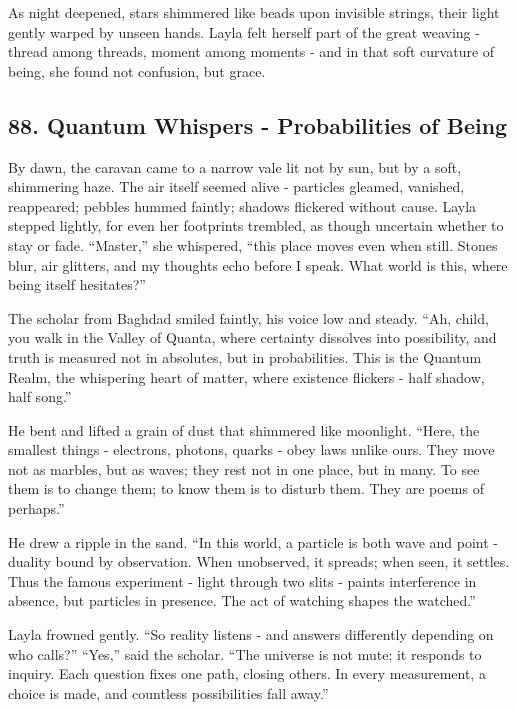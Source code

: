 \documentclass[
  letterpaper,
  DIV=11,
  numbers=noendperiod]{scrreprt}
\begin{document}
As night deepened, stars shimmered like beads upon invisible strings,
their light gently warped by unseen hands. Layla felt herself part of
the great weaving - thread among threads, moment among moments - and in
that soft curvature of being, she found not confusion, but grace.

\subsection{88. Quantum Whispers - Probabilities of
Being}\label{quantum-whispers---probabilities-of-being}

By dawn, the caravan came to a narrow vale lit not by sun, but by a
soft, shimmering haze. The air itself seemed alive - particles gleamed,
vanished, reappeared; pebbles hummed faintly; shadows flickered without
cause. Layla stepped lightly, for even her footprints trembled, as
though uncertain whether to stay or fade. ``Master,'' she whispered,
``this place moves even when still. Stones blur, air glitters, and my
thoughts echo before I speak. What world is this, where being itself
hesitates?''

The scholar from Baghdad smiled faintly, his voice low and steady. ``Ah,
child, you walk in the Valley of Quanta, where certainty dissolves into
possibility, and truth is measured not in absolutes, but in
probabilities. This is the Quantum Realm, the whispering heart of
matter, where existence flickers - half shadow, half song.''

He bent and lifted a grain of dust that shimmered like moonlight.
``Here, the smallest things - electrons, photons, quarks - obey laws
unlike ours. They move not as marbles, but as waves; they rest not in
one place, but in many. To see them is to change them; to know them is
to disturb them. They are poems of perhaps.''

He drew a ripple in the sand. ``In this world, a particle is both wave
and point - duality bound by observation. When unobserved, it spreads;
when seen, it settles. Thus the famous experiment - light through two
slits - paints interference in absence, but particles in presence. The
act of watching shapes the watched.''

Layla frowned gently. ``So reality listens - and answers differently
depending on who calls?'' ``Yes,'' said the scholar. ``The universe is
not mute; it responds to inquiry. Each question fixes one path, closing
others. In every measurement, a choice is made, and countless
possibilities fall away.''
\end{document}
